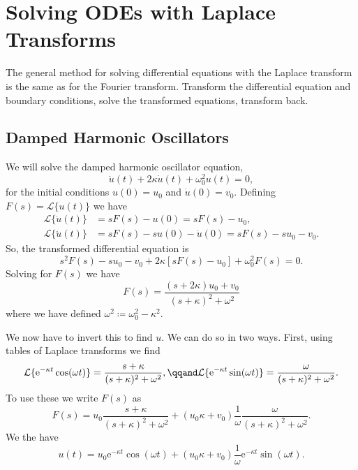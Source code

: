 \documentclass[fleqn]{NotesClass}
\newcommand*{\e}{\mathrm{e}}
\newcommand*{\laplaceTransform}{\mathcal{L}}
\begin{document}
    \section{Solving ODEs with Laplace Transforms}
    The general method for solving differential equations with the Laplace transform is the same as for the Fourier transform.
    Transform the differential equation and boundary conditions, solve the transformed equations, transform back.
    
    \subsection{Damped Harmonic Oscillators}
    We will solve the damped harmonic oscillator equation,
    \begin{equation}
        \ddot{u}(t) + 2\kappa\dot{u}(t) + \omega_0^2u(t) = 0,
    \end{equation}
    for the initial conditions \(u(0) = u_0\) and \(\dot{u}(0) = v_0\).
    Defining \(F(s) = \laplaceTransform\{u(t)\}\) we have
    \begin{align}
        \laplaceTransform\{\dot{u}(t)\} &= sF(s) - u(0) = sF(s) - u_0,\\
        \laplaceTransform\{\ddot{u}(t)\} &= sF(s) - su(0) - \dot{u}(0) = sF(s) - su_0 - v_0.
    \end{align}
    So, the transformed differential equation is
    \begin{equation}
        s^2F(s) - su_0 - v_0 + 2\kappa[sF(s) - u_0] + \omega_0^2 F(s) = 0.
    \end{equation}
    Solving for \(F(s)\) we have
    \begin{equation}
        F(s) = \frac{(s + 2\kappa)u_0 + v_0}{(s + \kappa)^2 + \omega^2}
    \end{equation}
    where we have defined \(\omega^2 \coloneqq \omega_0^2 - \kappa^2\).
    
    We now have to invert this to find \(u\).
    We can do so in two ways.
    First, using tables of Laplace transforms we find
    \begin{equation}
        \laplaceTransform\{\e^{-\kappa t}\cos(\omega t)\} = \frac{s + \kappa}{(s + \kappa)^2 + \omega^2}, \qqand \laplaceTransform\{\e^{-\kappa t}\sin(\omega t)\} = \frac{\omega}{(s + \kappa)^2 + \omega^2}.
    \end{equation}
    To use these we write \(F(s)\) as
    \begin{equation}
        F(s) = u_0\frac{s + \kappa}{(s + \kappa)^2 + \omega^2} + (u_0\kappa + v_0)\frac{1}{\omega} \frac{\omega}{(s + \kappa)^2 + \omega^2}.
    \end{equation}
    We the have
    \begin{equation}
        u(t) = u_0\e^{-\kappa t}\cos(\omega t) + (u_0\kappa + v_0)\frac{1}{\omega}\e^{-\kappa t}\sin(\omega t).
    \end{equation}
    
\end{document}
